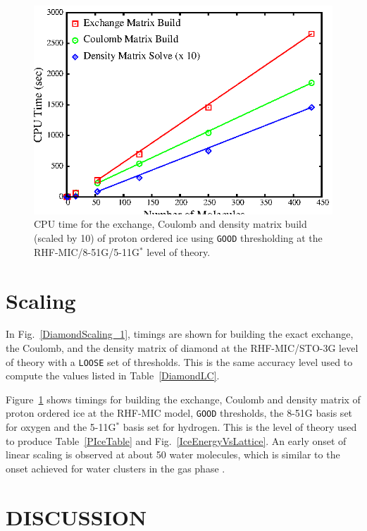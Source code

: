 \documentclass[prb,aps,nobibnotes,twocolumn,doublespace,twocolumngrid,superbib,showpacs]{revtex4}
\begin{document}
\begin{figure}[h]
\caption{CPU time for the exchange, Coulomb and density 
matrix build (scaled by 10) of proton ordered ice using {\tt GOOD}
thresholding at the RHF-MIC/8-51G/5-11G$^*$ level of theory.}
\label{IceScaling}
{\centering \includegraphics{Timing_pIce_ONX_1.ps} \par} 
\end{figure}

\section{Scaling}\label{scaling}

In Fig.~\ref{DiamondScaling_1}, timings are shown for building the exact exchange, the Coulomb, 
and the density matrix of diamond at the RHF-MIC/STO-3G level of theory with  a {\tt LOOSE} 
set of thresholds.  This is the same accuracy level used to compute the values listed in Table~\ref{DiamondLC}.

Figure~\ref{IceScaling} shows timings for building the  exchange, Coulomb and density matrix
of proton ordered ice \cite{SCasassa97} at the RHF-MIC model, {\tt GOOD} thresholds, the 8-51G basis 
set for oxygen and the 5-11G$^*$ basis set for hydrogen.  This is the level of theory used to
produce Table~\ref{PIceTable} and Fig.~\ref{IceEnergyVsLattice}.  An early onset of linear scaling 
is observed at about 50 water molecules, which is similar to the onset achieved for water clusters 
in the gas phase \cite{ANiklasson03}.

\section{DISCUSSION}\label{discussion}
\end{document}
